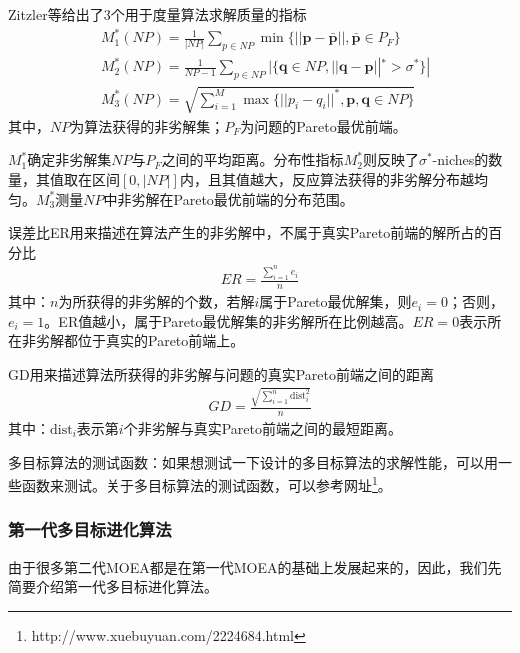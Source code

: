             \begin{definition}
            Zitzler等给出了3个用于度量算法求解质量的指标
            \begin{align*}
            & M_1^*(NP) = \frac{1}{|NP|}\sum_{p\in NP}\min\{||\mathbf{p}-\bar{\mathbf{p}}||,\bar{\mathbf{p}}\in P_F\}\\
            & M_2^*(NP) = \frac{1}{NP-1}\sum_{p\in NP} |\{\mathbf{q}\in NP,||\mathbf{q}-\mathbf{p}||^* >\sigma ^*  \}|\\
            & M_3^*(NP) = \sqrt{\sum_{i=1}^M\max\{||p_i-q_i||^*,\mathbf{p},\mathbf{q}\in NP\}}
            \end{align*}
            其中，$NP$为算法获得的非劣解集；$P_F$为问题的Pareto最优前端。
            \end{definition}
            \par
            $M_1^*$确定非劣解集$NP$与$P_F$之间的平均距离。分布性指标$M_2^*$则反映了$\sigma^*$-niches的数量，其值取在区间$[0,|NP|]$内，且其值越大，反应算法获得的非劣解分布越均匀。$M_3^*$测量$NP$中非劣解在Pareto最优前端的分布范围。
            \begin{definition}[误差比ER]
            误差比ER用来描述在算法产生的非劣解中，不属于真实Pareto前端的解所占的百分比
            \begin{align*}
            ER = \frac{\sum_{i=1}^ne_i}{n}
            \end{align*}
            其中：$n$为所获得的非劣解的个数，若解$i$属于Pareto最优解集，则$e_i=0$；否则，$e_i=1$。ER值越小，属于Pareto最优解集的非劣解所在比例越高。$ER=0$表示所在非劣解都位于真实的Pareto前端上。
            \end{definition}
            \begin{definition}[GD距离]
            GD用来描述算法所获得的非劣解与问题的真实Pareto前端之间的距离
            \begin{align*}
            GD = \frac{\sqrt{\sum_{i=1}^n\mathrm{dist}_i^2}}{n}
            \end{align*}
            其中：$\mathrm{dist}_i$表示第$i$个非劣解与真实Pareto前端之间的最短距离。
            \end{definition}
            \par
            多目标算法的测试函数：如果想测试一下设计的多目标算法的求解性能，可以用一些函数来测试。关于多目标算法的测试函数，可以参考网址\footnote{http://www.xuebuyuan.com/2224684.html}。
        \subsubsection{第一代多目标进化算法}
            \par
            由于很多第二代MOEA都是在第一代MOEA的基础上发展起来的，因此，我们先简要介绍第一代多目标进化算法。
